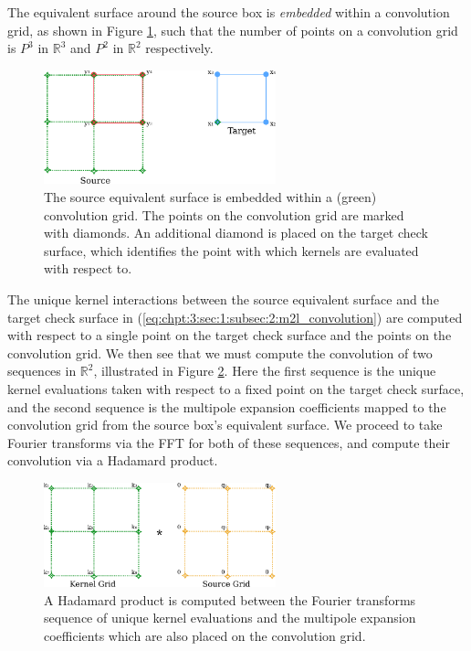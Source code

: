 The equivalent surface around the source box is \textit{embedded} within a convolution grid, as shown in Figure \ref{fig:chpt:3:sec:1:subsec:2:embed_surface_grid}, such that the number of points on a convolution grid is $P^3$ in $\mathbb{R}^3$ and $P^2$ in $\mathbb{R}^2$ respectively.

\begin{figure}
    \centering
    \includegraphics[width=0.6\textwidth]{images/ch_3/embed_surface_grid.pdf}
    \caption{The source equivalent surface is embedded within a (green) convolution grid. The points on the convolution grid are marked with diamonds. An additional diamond is placed on the target check surface, which identifies the point with which kernels are evaluated with respect to.}
    \label{fig:chpt:3:sec:1:subsec:2:embed_surface_grid}
\end{figure}

The unique kernel interactions between the source equivalent surface and the target check surface in (\ref{eq:chpt:3:sec:1:subsec:2:m2l_convolution}) are computed with respect to a single point on the target check surface and the points on the convolution grid. We then see that we must compute the convolution of two sequences in $\mathbb{R}^2$, illustrated in Figure \ref{fig:chpt:3:sec:1:subsec:2:convolution}. Here the first sequence is the unique kernel evaluations taken with respect to a fixed point on the target check surface, and the second sequence is the multipole expansion coefficients mapped to the convolution grid from the source box's equivalent surface. We proceed to take Fourier transforms via the FFT for both of these sequences, and compute their convolution via a Hadamard product.

\begin{figure}
    \centering
    \includegraphics[width=0.6\textwidth]{images/ch_3/convolution.pdf}
    \caption{A Hadamard product is computed between the Fourier transforms sequence of unique kernel evaluations and the multipole expansion coefficients which are also placed on the convolution grid.}
    \label{fig:chpt:3:sec:1:subsec:2:convolution}
\end{figure}

